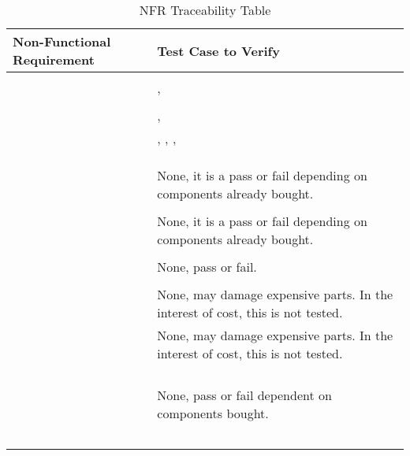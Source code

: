 \documentclass[12pt, titlepage]{article}
\begin{document}
\begin{table}[!h]
\begin{center}
\caption {NFR Traceability Table}
\label{tab:traceTC_NFR}
\begin{tabular}{ | m{3cm} | m{12cm} | } 
\hline
Non-Functional Requirement & Test Case to Verify \\
\hline
\nameref{PERF_001} & \nameref{tab:STCR_013} \\ \hline
\nameref{PERF_002} & \nameref{tab:STCR_002}, \nameref{tab:STCR_003} \\ \hline
\nameref{PERF_003} & \nameref{tab:STCR_004} \\ \hline
\nameref{PERF_004} &  \nameref{tab:STCR_013}, \nameref{tab:UTCR_007} \\ \hline
\nameref{PERF_005} & \nameref{tab:STCR_002}, \nameref{tab:STCR_003}, \nameref{tab:UTCR_005}, \nameref{tab:UTCR_006} \\ \hline
\nameref{PERF_006} & \nameref{tab:STCR_004} \\ \hline
\nameref{PERF_007} & \nameref{tab:STCR_015} \\ \hline
\nameref{PERF_008} & \nameref{tab:STCR_004} \\ \hline
\nameref{DES_001} & None, it is a pass or fail depending on components already bought. \\ \hline
\nameref{STD_001} & \nameref{tab:STCR_019} \\ \hline
\nameref{STD_002} & None, it is a pass or fail depending on components already bought. \\ \hline
\nameref{SEC_001} & \nameref{tab:UTCR_009} \\ \hline
\nameref{SEC_002} & None, pass or fail. \\ \hline
\nameref{MTNC_001} & \nameref{tab:STCR_020} \\ \hline
\nameref{MTNC_002} & None, may damage expensive parts. In the interest of cost, this is not tested. \\ \hline
\nameref{MTNC_003} & None, may damage expensive parts. In the interest of cost, this is not tested. \\ \hline
\nameref{SAFE_001} & \nameref{tab:STCR_021} \\ \hline
\nameref{SAFE_002} & \nameref{tab:STCR_002} \\ \hline
\nameref{SAFE_003} & \nameref{tab:STCR_018} \\ \hline
\nameref{SAFE_004} & \nameref{tab:STCR_021} \\ \hline
\nameref{SAFE_005} & None, pass or fail dependent on components bought. \\ \hline
\nameref{USE_001} & \nameref{tab:STCR_004} \\ \hline
\nameref{USE_002} & \nameref{tab:STCR_022} \\ \hline
\nameref{USE_003} & \nameref{tab:STCR_006} \\ \hline
\nameref{USE_004} & \nameref{tab:STCR_017} \\ \hline
\nameref{USE_005} & \nameref{tab:UTCR_008} \\ \hline
\end{tabular}
\end{center}
\end{table}
\end{document}
